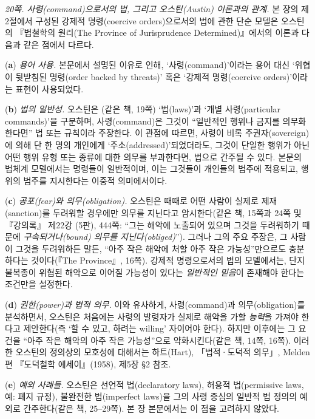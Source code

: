 \documentclass[12pt, oneside]{book}  %
\begin{document}
\emph{20쪽. 사령(command)으로서의 법, 그리고 오스틴(Austin) 이론과의
관계.} 본 장의 제2절에서 구성된 강제적 명령(coercive orders)으로서의
법에 관한 단순 모델은 오스틴의 『법철학의 원리(The Province of
Jurisprudence Determined)』에서의 이론과 다음과 같은 점에서 다르다.

(\textbf{a}) \emph{용어 사용.} 본문에서 설명된 이유로 인해,
`사령(command)'이라는 용어 대신 `위협이 뒷받침된 명령(order backed by
threats)' 혹은 `강제적 명령(coercive orders)'이라는 표현이 사용되었다.

(\textbf{b}) \emph{법의 일반성.} 오스틴은 (같은 책, 19쪽) `법(laws)'과
`개별 사령(particular commands)'을 구분하며, 사령(command)은 그것이
``일반적인 행위나 금지를 의무화한다면'' 법 또는 규칙이라 주장한다. 이
관점에 따르면, 사령이 비록 주권자(sovereign)에 의해 단 한 명의 개인에게
`주소(addressed)'되었더라도, 그것이 단일한 행위가 아닌 어떤 행위 유형
또는 종류에 대한 의무를 부과한다면, 법으로 간주될 수 있다. 본문의 법체계
모델에서는 명령들이 일반적이며, 이는 그것들이 개인들의 범주에 적용되고,
행위의 범주를 지시한다는 이중적 의미에서이다.

(\textbf{c}) \emph{공포(fear)와 의무(obligation).} 오스틴은 때때로 어떤
사람이 실제로 제재(sanction)를 두려워할 경우에만 의무를 지닌다고
암시한다(같은 책, 15쪽과 24쪽 및 『강의록』 제22강 (5판), 444쪽: ``그는
해악에 노출되어 있으며 그것을 두려워하기 때문에 \emph{구속되거나(bound)}
\emph{의무를 지닌다(obliged)}''). 그러나 그의 주요 주장은, 그 사람이
그것을 두려워하든 말든, ``아주 작은 해악에 처할 아주 작은
가능성''만으로도 충분하다는 것이다(『The Province』, 16쪽). 강제적
명령으로서의 법의 모델에서는, 단지 불복종이 위협된 해악으로 이어질
가능성이 있다는 \emph{일반적인 믿음}이 존재해야 한다는 조건만을
설정한다.

(\textbf{d}) \emph{권한(power)과 법적 의무.} 이와 유사하게,
사령(command)과 의무(obligation)를 분석하면서, 오스틴은 처음에는 사령의
발령자가 실제로 해악을 가할 \emph{능력}을 가져야 한다고 제안한다(즉 `할
수 있고, 하려는 willing' 자이어야 한다). 하지만 이후에는 그 요건을
``아주 작은 해악의 아주 작은 가능성''으로 약화시킨다(같은 책, 14쪽,
16쪽). 이러한 오스틴의 정의상의 모호성에 대해서는 하트(Hart),
「법적·도덕적 의무」, Melden 편 『도덕철학 에세이』(1958), 제5장 §2
참조.

(\textbf{e}) \emph{예외 사례들.} 오스틴은 선언적 법(declaratory laws),
허용적 법(permissive laws, 예: 폐지 규정), 불완전한 법(imperfect laws)을
그의 사령 중심의 일반적 법 정의의 예외로 간주한다(같은 책, 25--29쪽). 본
장 본문에서는 이 점을 고려하지 않았다.
\end{document}
